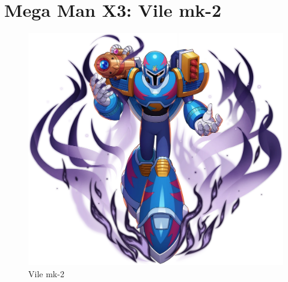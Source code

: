 \section{Mega Man X3: Vile mk-2}
\begin{figure}[htp]
	\centering
	\includegraphics[height=\portraitsize]{figures/X3/Doppler_stages/X_DiVE_Vile_MK-II.png}
	\caption{Vile mk-2}
\end{figure}
